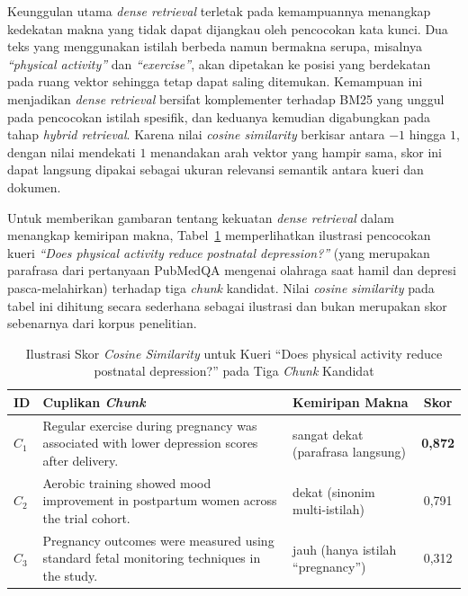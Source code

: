 Keunggulan utama \textit{dense retrieval} terletak pada kemampuannya menangkap kedekatan makna yang tidak dapat dijangkau oleh pencocokan kata kunci. Dua teks yang menggunakan istilah berbeda namun bermakna serupa, misalnya \textit{``physical activity''} dan \textit{``exercise''}, akan dipetakan ke posisi yang berdekatan pada ruang vektor sehingga tetap dapat saling ditemukan. Kemampuan ini menjadikan \textit{dense retrieval} bersifat komplementer terhadap BM25 yang unggul pada pencocokan istilah spesifik, dan keduanya kemudian digabungkan pada tahap \textit{hybrid retrieval}. Karena nilai \textit{cosine similarity} berkisar antara $-1$ hingga $1$, dengan nilai mendekati $1$ menandakan arah vektor yang hampir sama, skor ini dapat langsung dipakai sebagai ukuran relevansi semantik antara kueri dan dokumen.

Untuk memberikan gambaran tentang kekuatan \textit{dense retrieval} dalam menangkap kemiripan makna, Tabel~\ref{tbl:dense-contoh} memperlihatkan ilustrasi pencocokan kueri \textit{``Does physical activity reduce postnatal depression?''} (yang merupakan parafrasa dari pertanyaan PubMedQA mengenai olahraga saat hamil dan depresi pasca-melahirkan) terhadap tiga \textit{chunk} kandidat. Nilai \textit{cosine similarity} pada tabel ini dihitung secara sederhana sebagai ilustrasi dan bukan merupakan skor sebenarnya dari korpus penelitian.

\begin{table}[H]
\centering
\footnotesize
\setlength{\tabcolsep}{4pt}
\caption{Ilustrasi Skor \textit{Cosine Similarity} untuk Kueri ``Does physical activity reduce postnatal depression?'' pada Tiga \textit{Chunk} Kandidat}
\label{tbl:dense-contoh}
\begin{tabular}{p{0.7cm} p{8.2cm} p{1.8cm} c}
\toprule
\textbf{ID} & \textbf{Cuplikan \textit{Chunk}} & \textbf{Kemiripan Makna} & \textbf{Skor} \\
\midrule
$C_1$ & Regular exercise during pregnancy was associated with lower depression scores after delivery. & sangat dekat (parafrasa langsung) & \textbf{0{,}872} \\
\addlinespace
$C_2$ & Aerobic training showed mood improvement in postpartum women across the trial cohort. & dekat (sinonim multi-istilah) & 0{,}791 \\
\addlinespace
$C_3$ & Pregnancy outcomes were measured using standard fetal monitoring techniques in the study. & jauh (hanya istilah ``pregnancy'') & 0{,}312 \\
\bottomrule
\end{tabular}
\end{table}

